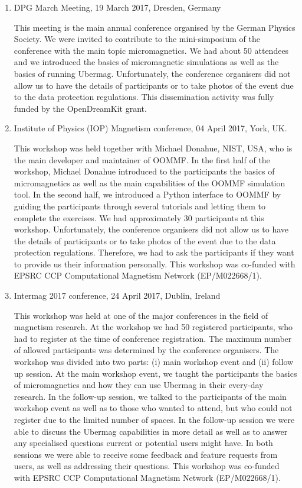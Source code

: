 \documentclass{deliverablereport}
\begin{document}
\begin{enumerate}

\item DPG March Meeting, 19 March 2017, Dresden, Germany

  This meeting is the main annual conference organised by the German
  Physics Society. We were invited to contribute to the mini-simposium
  of the conference with the main topic micromagnetics. We had about
  50 attendees and we introduced the basics of micromagnetic
  simulations as well as the basics of running Ubermag. Unfortunately,
  the conference organisers did not allow us to have the details of
  participants or to take photos of the event due to the data
  protection regulations. This dissemination activity was fully funded
  by the OpenDreamKit grant.
  
\item Institute of Physics (IOP) Magnetism conference, 04 April 2017,
York, UK.

  This workshop was held together with Michael Donahue, NIST, USA, who
is the main developer and maintainer of OOMMF. In the first half of
the workshop, Michael Donahue introduced to the participants the
basics of micromagnetics as well as the main capabilities of the OOMMF
simulation tool. In the second half, we introduced a Python interface
to OOMMF by guiding the participants through several tutorials and
letting them to complete the exercises. We had approximately 30
participants at this workshop. Unfortunately, the conference
organisers did not allow us to have the details of participants or to
take photos of the event due to the data protection
regulations. Therefore, we had to ask the participants if they want to
provide us their information personally. This workshop was co-funded
with EPSRC CCP Computational Magnetism Network (EP/M022668/1).

\item Intermag 2017 conference, 24 April 2017, Dublin, Ireland

  This workshop was held at one of the major conferences in the field
of magnetism research. At the workshop we had 50 registered
participants, who had to register at the time of conference
registration. The maximum number of allowed participants was
determined by the conference organisers. The workshop was divided into
two parts: (i) main workshop event and (ii) follow up session. At the
main workshop event, we taught the participants the basics of
micromagnetics and how they can use Ubermag in their every-day
research. In the follow-up session, we talked to the participants of
the main workshop event as well as to those who wanted to attend, but
who could not register due to the limited number of spaces. In the
follow-up session we were able to discuss the Ubermag capabilities in
more detail as well as to answer any specialised questions current or
potential users might have. In both sessions we were able to receive
some feedback and feature requests from users, as well as addressing
their questions. This workshop was
co-funded with EPSRC CCP Computational Magnetism Network
(EP/M022668/1).


\end{enumerate}
\end{document}
